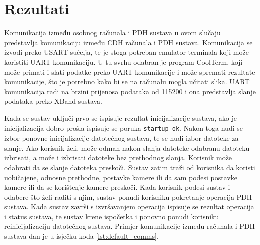 \chapter{Rezultati}

Komunikacija između osobnog računala i PDH sustava u ovom slučaju predstavlja komunikaciju između CDH računala i PDH sustava. Komunikacija se izvodi preko USART sučelja, te je stoga potreban emulator terminala koji može koristiti UART komunikaciju. U tu svrhu odabran je program CoolTerm, koji može primati i slati podatke preko UART komunikacije i može spremati rezultate komunikacije, što je potrebno kako bi se na računalu mogla učitati slika. UART komunikacija radi na brzini prijenosa podataka od 115200 i ona predstavlja slanje podataka preko XBand sustava.

Kada se sustav uključi prvo se ispisuje rezultat inicijalizacije sustava, ako je inicijalizacija dobro prošla ispisuje se poruka \verb|startup_ok|. Nakon toga nudi se izbor ponovne inicijalizacije datotečnog sustava, te se nudi izbor datoteke za slanje. Ako korisnik želi, može odmah nakon slanja datoteke odabranu datoteku izbrisati, a može i izbrisati datoteke bez prethodnog slanja. Korisnik može odabrati da se slanje datoteka preskoči. Sustav zatim traži od korisnika da koristi uobičajene, odnosne prethodne, postavke kamere ili da sam podesi postavke kamere ili da se korištenje kamere preskoči. Kada korisnik podesi sustav i odabere što želi raditi s njim, sustav ponudi korisniku pokretanje operacija PDH sustava. Kada sustav završi s izvršavanjem operacija ispisuje se rezultat operacija i status sustava, te sustav krene ispočetka i ponovno ponudi korisniku reinicijalizaciju datotečnog sustava. Primjer komunikacije između računala i PDH sustava dan je u isječku koda \ref{lst:default_comms}.

